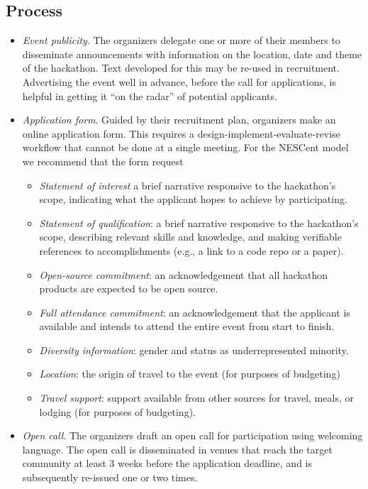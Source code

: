 \documentclass[letterpaper,11pt]{texMemo}
\begin{document}
\subsection{Process}
\begin{itemize}
\item	{\em Event publicity}. The organizers delegate one or more of their members to disseminate announcements with information on the location, date and theme of the hackathon. Text developed for this may be re-used in recruitment. Advertising the event well in advance, before the call for applications, is helpful in getting it “on the radar” of potential applicants.
\item	{\em Application form}. Guided by their recruitment plan, organizers make an online application form. This requires a design-implement-evaluate-revise workflow that cannot be done at a single meeting. For the NESCent model we recommend that the form request 
\begin{itemize}
\item	{\em Statement of interest} a brief narrative responsive to the hackathon’s scope, indicating what the applicant hopes to achieve by participating. 
\item	{\em Statement of qualification}: a brief narrative responsive to the hackathon’s scope, describing relevant skills and knowledge, and making verifiable references to accomplishments (e.g., a link to a code repo or a paper).
\item	{\em Open-source commitment}: an acknowledgement that all hackathon products are expected to be open source. 
\item	{\em Full attendance commitment}: an acknowledgement that the applicant is available and intends to attend the entire event from start to finish. 
\item	{\em Diversity information}: gender and status as underrepresented minority. 
\item	{\em Location}: the origin of travel to the event (for purposes of budgeting)
\item	{\em Travel support}: support available from other sources for travel, meals, or lodging (for purposes of budgeting).  
\end{itemize}
\item	{\em Open call}. The organizers draft an open call for participation using welcoming language. The open call is disseminated in venues that reach the target community at least 3 weeks before the application deadline, and is subsequently re-issued one or two times.   

\end{itemize}
\end{document}
